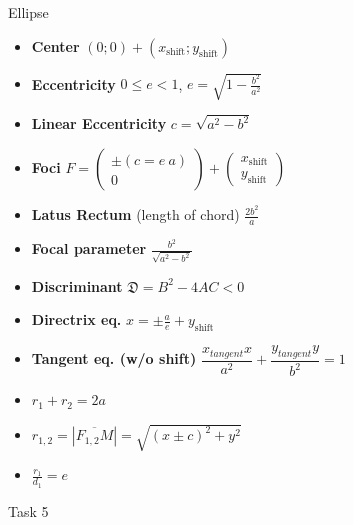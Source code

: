 \documentclass[aspectratio=169]{beamer}
\newcommand{\shf}{\text{shift}}
\begin{document}
\begin{frame}[t]{Ellipse}
\begin{multicols}{3}
\begin{itemize}
            \item \textbf{Center} $(0;0) + (x_{\shf};y_{\shf})$
            \item \textbf{Eccentricity} $0 \leq e < 1$, $e = \sqrt{1 - \frac{b^2}{a^2}}$
            \item \textbf{Linear Eccentricity} $c = \sqrt{a^2-b^2}$
            \item \textbf{Foci} $F = \begin{pmatrix} \pm(c= e\ a)\\ 0 \end{pmatrix} + \begin{pmatrix} x_{\shf}\\y_{\shf} \end{pmatrix}$
            \item \textbf{Latus Rectum} (length of chord) $\frac{2b^2}{a}$
            \item \textbf{Focal parameter}  $\frac{b^2}{\sqrt{a^2-b^2}}$
            \item \textbf{Discriminant} $\mathfrak{D} = B^2 - 4AC < 0$
            \item \textbf{Directrix eq.} $x = \pm \frac{a}{e} + y_{\shf}$
            \item \textbf{Tangent eq. (w/o shift)} $\dfrac{x_{tangent} x}{a^2}+\dfrac{y_{tangent} y}{b^2}=1$
            \item $r_1 + r_2 = 2a$
            \item $r_{1,2} = |\overline{F_{1,2}M}|=\sqrt{(x \pm c)^2+y^2}$
            \item $\frac{r_1}{d_1}=e$
            \end{itemize}
    \end{multicols}
    \end{frame}

    \begin{frame}[t]{Task 5}
        \framesubtitle{}
    \end{frame}
\end{document}
